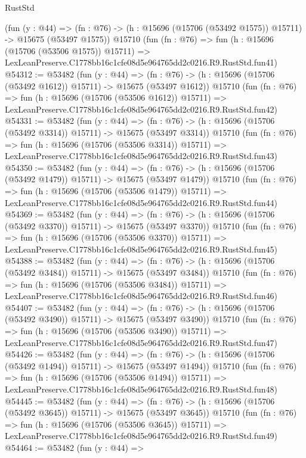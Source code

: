 \begin{lexlean}{RustStd}
\begin{coremodule}
    (fun (y : @44) =>
    (fn : @76) -> (h : @15696 (@15706 (@53492 @1575)) @15711) -> @15675 (@53497 @1575))
    @15710
    (fun (fn : @76) =>
    fun (h : @15696 (@15706 (@53506 @1575)) @15711) =>
    LexLeanPreserve.C1778bb16c1cfe08d5e964765dd2c0216.R9.RustStd.fun41)
@54312 := @53482
    (fun (y : @44) =>
    (fn : @76) -> (h : @15696 (@15706 (@53492 @1612)) @15711) -> @15675 (@53497 @1612))
    @15710
    (fun (fn : @76) =>
    fun (h : @15696 (@15706 (@53506 @1612)) @15711) =>
    LexLeanPreserve.C1778bb16c1cfe08d5e964765dd2c0216.R9.RustStd.fun42)
@54331 := @53482
    (fun (y : @44) =>
    (fn : @76) -> (h : @15696 (@15706 (@53492 @3314)) @15711) -> @15675 (@53497 @3314))
    @15710
    (fun (fn : @76) =>
    fun (h : @15696 (@15706 (@53506 @3314)) @15711) =>
    LexLeanPreserve.C1778bb16c1cfe08d5e964765dd2c0216.R9.RustStd.fun43)
@54350 := @53482
    (fun (y : @44) =>
    (fn : @76) -> (h : @15696 (@15706 (@53492 @1479)) @15711) -> @15675 (@53497 @1479))
    @15710
    (fun (fn : @76) =>
    fun (h : @15696 (@15706 (@53506 @1479)) @15711) =>
    LexLeanPreserve.C1778bb16c1cfe08d5e964765dd2c0216.R9.RustStd.fun44)
@54369 := @53482
    (fun (y : @44) =>
    (fn : @76) -> (h : @15696 (@15706 (@53492 @3370)) @15711) -> @15675 (@53497 @3370))
    @15710
    (fun (fn : @76) =>
    fun (h : @15696 (@15706 (@53506 @3370)) @15711) =>
    LexLeanPreserve.C1778bb16c1cfe08d5e964765dd2c0216.R9.RustStd.fun45)
@54388 := @53482
    (fun (y : @44) =>
    (fn : @76) -> (h : @15696 (@15706 (@53492 @3484)) @15711) -> @15675 (@53497 @3484))
    @15710
    (fun (fn : @76) =>
    fun (h : @15696 (@15706 (@53506 @3484)) @15711) =>
    LexLeanPreserve.C1778bb16c1cfe08d5e964765dd2c0216.R9.RustStd.fun46)
@54407 := @53482
    (fun (y : @44) =>
    (fn : @76) -> (h : @15696 (@15706 (@53492 @3490)) @15711) -> @15675 (@53497 @3490))
    @15710
    (fun (fn : @76) =>
    fun (h : @15696 (@15706 (@53506 @3490)) @15711) =>
    LexLeanPreserve.C1778bb16c1cfe08d5e964765dd2c0216.R9.RustStd.fun47)
@54426 := @53482
    (fun (y : @44) =>
    (fn : @76) -> (h : @15696 (@15706 (@53492 @1494)) @15711) -> @15675 (@53497 @1494))
    @15710
    (fun (fn : @76) =>
    fun (h : @15696 (@15706 (@53506 @1494)) @15711) =>
    LexLeanPreserve.C1778bb16c1cfe08d5e964765dd2c0216.R9.RustStd.fun48)
@54445 := @53482
    (fun (y : @44) =>
    (fn : @76) -> (h : @15696 (@15706 (@53492 @3645)) @15711) -> @15675 (@53497 @3645))
    @15710
    (fun (fn : @76) =>
    fun (h : @15696 (@15706 (@53506 @3645)) @15711) =>
    LexLeanPreserve.C1778bb16c1cfe08d5e964765dd2c0216.R9.RustStd.fun49)
@54464 := @53482
    (fun (y : @44) =>

\end{coremodule}
\end{lexlean}
